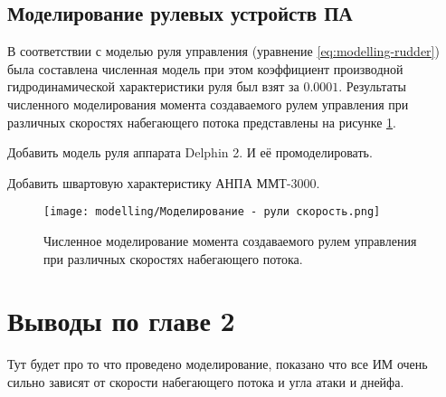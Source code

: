 \subsection{Моделирование рулевых устройств ПА}
В соответствии с моделью руля управления (уравнение \ref{eq:modelling-rudder}) была составлена численная модель при этом коэффициент производной гидродинамической характеристики руля был взят за $0.0001$.
Результаты численного моделирования момента создаваемого рулем управления при различных скоростях набегающего потока представлены на рисунке \ref{fig:modelling-rudder-velocity}.

\begin{noteplan}
    Добавить модель руля аппарата Delphin 2. И её промоделировать.
\end{noteplan}

\begin{noteplan}
    Добавить швартовую характеристику АНПА ММТ-3000.
\end{noteplan}

\begin{figure}[ht]
    \centering
    \texttt{[image: modelling/Моделирование - рули скорость.png]}
    \caption{Численное моделирование момента создаваемого рулем управления при различных скоростях набегающего потока.}
    \label{fig:modelling-rudder-velocity}
\end{figure}

\section{Выводы по главе 2}
\begin{noteplan}
	Тут будет про то что проведено моделирование, показано что все ИМ очень сильно зависят от скорости набегающего потока и угла атаки и днейфа.
\end{noteplan}